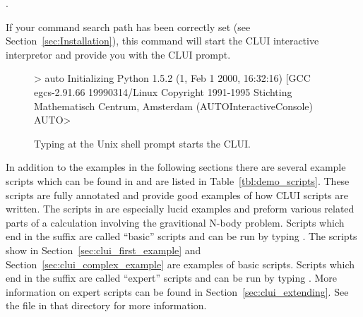 \documentclass[12pt]{report}
\begin{document}
 \centerline {.}

 If your command search path has been correctly set (see
 Section~\ref{sec:Installation}), this command will start the \AUTO CLUI
 interactive interpretor and provide you with the \AUTO CLUI prompt.

 \begin{figure}[htbp]
 {\small 
 \begin{center} \begin{boxedverbatim}
 > auto
 Initializing
 Python 1.5.2 (1, Feb  1 2000, 16:32:16)  [GCC egcs-2.91.66 19990314/Linux 
 Copyright 1991-1995 Stichting Mathematisch Centrum, Amsterdam
 (AUTOInteractiveConsole)
 AUTO> 
 \end{boxedverbatim}
 \end{center}
 }
 \caption[Starting the \AUTO CLUI.]
 {Typing  at the Unix shell prompt starts the
 \AUTO CLUI.  }
 \label{exa:clui_starting}
 \end{figure}

 In addition to the examples in the following sections there are
 several example scripts which can be found in
  and are listed in
 Table~\ref{tbl:demo_scripts}.  These scripts are fully annotated and
 provide good examples of how \AUTO CLUI scripts are written.  The
 scripts in  are especially lucid
 examples and preform various related parts of a calculation involving
 the gravitional N-body problem.  
 Scripts which end in the
 suffix  are called ``basic'' scripts and can
 be run by typing .
 The scripts show in Section~\ref{sec:clui_first_example}
 and Section~\ref{sec:clui_complex_example} are examples
 of basic scripts.
 Scripts which end in the
 suffix  are called ``expert'' scripts and can
 be run by typing .
 More information on expert scripts can be 
 found in Section~\ref{sec:clui_extending}.
 See the  file in that
 directory for more information.
\end{document}
